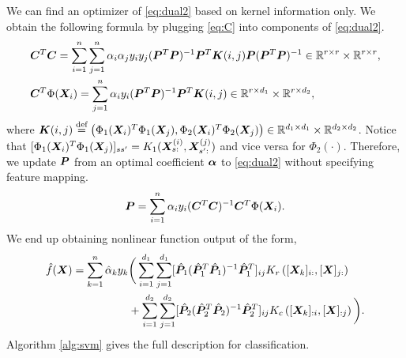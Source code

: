 \documentclass[12pt]{article}
\begin{document}
We can find an optimizer of \eqref{eq:dual2} based on kernel information only. We obtain the following formula by plugging \eqref{eq:C} into components of \eqref{eq:dual2}. 
\begin{align}\label{eq:helpeq}
 &\bm C^T\bm C = \sum_{i=1}^n\sum_{j=1}^n \alpha_i\alpha_jy_iy_j(\bm{P}^T\bm{P})^{-1}\bm{P}^T\bm K(i,j) \bm{P}(\bm{P}^T\bm{P})^{-1}\in\mathbb{R}^{r\times r}\times \mathbb{R}^{r\times r},\\
 &\bm C^T\Phi(\bm X_i) = \sum_{j=1}^n \alpha_iy_i(\bm{P}^T\bm{P})^{-1}\bm{P}^T\bm K(i,j)\in\mathbb{R}^{r\times d_1}\times \mathbb{R}^{r\times d_2},
\end{align}
where $\bm K(i,j) \stackrel{\text{def}}{=} \left( \Phi_1(\bm X_i)^T\Phi_1(\bm X_j),\Phi_2(\bm X_i)^T\Phi_2(\bm X_j)\right)\in \mathbb{R}^{d_1\times d_1}\times \mathbb{R}^{d_2\times d_2}$. Notice that $[\Phi_1(\bm X_i)^T
\Phi_1(\bm X_j)]_{ss'} = K_1(\bm X^{(i)}_{s:},\bm X^{(j)}_{s':})$ and vice versa for $\Phi_2(\cdot)$.
Therefore, we update $\bm{P}$  from an optimal coefficient $\bm\alpha$ to \eqref{eq:dual2} without specifying feature mapping.
\begin{align}
    \bm{P} = \sum_{i=1}^n\alpha_iy_i(\bm C^T\bm C)^{-1}\bm C^T\Phi(\bm X_i).
\end{align}
We end up obtaining nonlinear function output of the form,
\begin{align}\label{eq:output}
    \hat f(\bm X) = \sum_{k=1}^n\hat\alpha_ky_k&\bigg(\sum_{i=1}^{d_1}\sum_{j=1}^{d_1}[\hat{\bm{P}}_1(\hat{\bm{P}}_1^T\hat{\bm{P}}_1)^{-1}\hat{\bm{P}}_1^T]_{ij}K_r\left([\bm X_k]_{i:},[\bm X]_{j:}\right)\\ &+\sum_{i=1}^{d_2}\sum_{j=1}^{d_2}[\hat{\bm{P}}_2(\hat{\bm{P}}_2^T\hat{\bm{P}}_2)^{-1}\hat{\bm{P}}_2^T]_{ij}K_c\left([\bm X_k]_{:i},[\bm X]_{:j}\right)\bigg).
\end{align}
Algorithm \ref{alg:svm} gives the full description for classification. 
\end{document}
